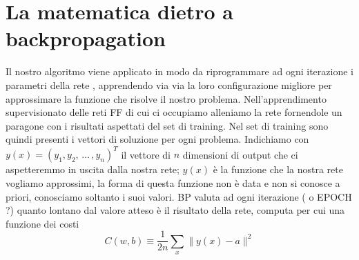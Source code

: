 \section*{La matematica dietro a backpropagation}
Il nostro algoritmo viene applicato in modo da riprogrammare ad ogni iterazione i parametri della rete , apprendendo via via la loro configurazione migliore per approssimare la funzione che risolve il nostro problema. Nell'apprendimento supervisionato delle reti FF di cui ci occupiamo alleniamo la rete fornendole un paragone con i risultati aspettati del set di training. Nel set di training sono quindi presenti i vettori di soluzione per ogni problema. Indichiamo con $ y(x)=(y_{1}, y_{2},\, \dots \, , y_{n})^{T} $ il vettore di $n$ dimensioni di output che ci aspetteremmo in uscita dalla  nostra rete; $y(x)$ è la funzione che la nostra rete vogliamo approssimi, la forma di questa funzione non è data e non si conosce a priori, conosciamo soltanto i suoi valori. BP valuta ad ogni iterazione ( o EPOCH ?) quanto lontano dal valore atteso è il risultato della rete, computa per cui una funzione dei costi
\begin{equation}
	C(w,b)\equiv\frac{1}{2n}\sum_{x} \parallel y(x)-a\parallel^{2}
\end{equation} 


